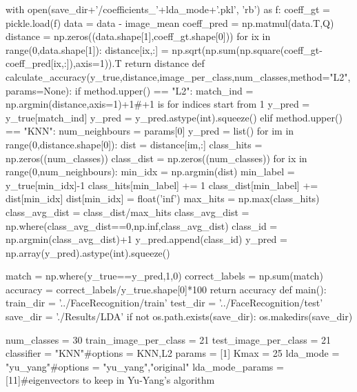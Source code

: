 \documentclass{article}
\begin{document}
\begin{python}
	with open(save_dir+'/coefficients_'+lda_mode+'.pkl', 'rb') as f:
		coeff_gt = pickle.load(f)
	data = data - image_mean
	coeff_pred = np.matmul(data.T,Q)
	distance = np.zeros((data.shape[1],coeff_gt.shape[0]))
	for ix in range(0,data.shape[1]):
		distance[ix,:] = np.sqrt(np.sum(np.square(coeff_gt-coeff_pred[ix,:]),axis=1)).T
	return distance
def calculate_accuracy(y_true,distance,image_per_class,num_classes,method="L2",params=None):
	if method.upper() == "L2":
		match_ind = np.argmin(distance,axis=1)+1#+1 is for indices start from 1
		y_pred = y_true[match_ind]
		y_pred = y_pred.astype(int).squeeze()
	elif method.upper() == "KNN":
		num_neighbours = params[0]
		y_pred = list()
		for im in range(0,distance.shape[0]):
			dist = distance[im,:]
			class_hits = np.zeros((num_classes))
			class_dist = np.zeros((num_classes))
			for ix in range(0,num_neighbours):
				min_idx = np.argmin(dist)
				min_label = y_true[min_idx]-1
				class_hits[min_label] += 1
				class_dist[min_label] += dist[min_idx]
				dist[min_idx] = float('inf')
			max_hits = np.max(class_hits)
			class_avg_dist = class_dist/max_hits
			class_avg_dist = np.where(class_avg_dist==0,np.inf,class_avg_dist)
			class_id = np.argmin(class_avg_dist)+1
			y_pred.append(class_id)
		y_pred = np.array(y_pred).astype(int).squeeze()

	match = np.where(y_true==y_pred,1,0)
	correct_labels = np.sum(match)
	accuracy = correct_labels/y_true.shape[0]*100
	return accuracy
def main():
	train_dir = '../FaceRecognition/train'
	test_dir = '../FaceRecognition/test'
	save_dir = './Results/LDA'
	if not os.path.exists(save_dir):
		os.makedirs(save_dir)

	num_classes = 30
	train_image_per_class = 21
	test_image_per_class = 21
	classifier = "KNN"#options = KNN,L2
	params = [1]
	Kmax = 25
	lda_mode = "yu_yang"#options = "yu_yang","original"
	lda_mode_params = [11]#eigenvectors to keep in Yu-Yang's algorithm


\end{python}
\end{document}
